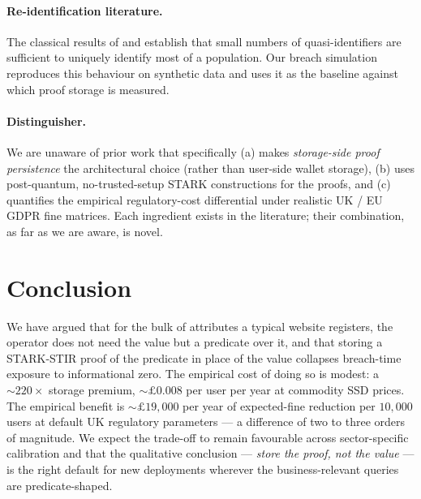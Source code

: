\documentclass[11pt,a4paper]{article}
\begin{document}
\paragraph{Re\nobreakdash-identification literature.}  The classical
results of \cite{narayanan2008robust} and
\cite{sweeney2000simple} establish that small numbers of
quasi\nobreakdash-identifiers are sufficient to uniquely identify
most of a population.  Our breach simulation reproduces this
behaviour on synthetic data and uses it as the baseline against
which proof storage is measured.

\paragraph{Distinguisher.}  We are unaware of prior work that
specifically (a) makes \emph{storage\nobreakdash-side proof
persistence} the architectural choice (rather than
user\nobreakdash-side wallet storage), (b) uses
post\nobreakdash-quantum, no\nobreakdash-trusted\nobreakdash-setup STARK
constructions for the proofs, and (c) quantifies the
empirical regulatory\nobreakdash-cost differential under realistic
UK / EU GDPR fine matrices.  Each ingredient exists in the
literature; their combination, as far as we are aware, is
novel.

\section{Conclusion}
\label{sec:conclusion}

We have argued that for the bulk of attributes a typical
website registers, the operator does not need the value but a
predicate over it, and that storing a STARK\nobreakdash-STIR proof
of the predicate in place of the value collapses
breach\nobreakdash-time exposure to informational zero.  The
empirical cost of doing so is modest: a $\sim\!220\!\times$
storage premium, $\sim\!\pounds 0.008$ per user per year at
commodity SSD prices.  The empirical benefit is
$\sim\!\pounds 19{,}000$ per year of expected\nobreakdash-fine
reduction per $10{,}000$ users at default UK regulatory
parameters — a difference of two to three orders of magnitude.
We expect the trade\nobreakdash-off to remain favourable across
sector\nobreakdash-specific calibration and that the
qualitative conclusion — \emph{store the proof, not the value} —
is the right default for new deployments wherever the
business\nobreakdash-relevant queries are predicate\nobreakdash-shaped.



\end{document}
